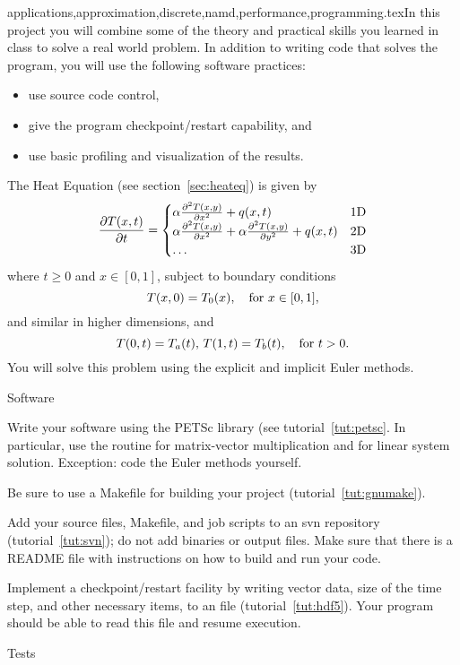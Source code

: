 {applications,approximation,discrete,namd,performance,programming}.texIn this project you will combine some of the theory and practical
skills you learned in class to solve a real world problem. In addition
to writing code that solves the program, you will use the following
software practices:
\begin{itemize}
  \item use source code control,
  \item give the program checkpoint/restart capability, and
  \item use basic profiling and visualization of the results.
\end{itemize}

The Heat Equation (see section~\ref{sec:heateq}) is given by
\[ \frac{\partial T(x,t)}{\partial t}=
\begin{cases}
  \alpha \frac{\partial^2 T(x,y)}{\partial x^2}+q(x,t)&\hbox{1D}\\
  \alpha \frac{\partial^2 T(x,y)}{\partial x^2}+
    \alpha \frac{\partial^2 T(x,y)}{\partial y^2}+q(x,t)&\hbox{2D}\\
    \ldots&\hbox{3D}
\end{cases}
\]
where $t\geq 0$ and $x\in[0,1]$, subject to boundary conditions
\[ T(x,0)=T_0(x),\quad\hbox{for $x\in[0,1]$}, \]
and similar in higher dimensions, and
\[ T(0,t)=T_a(t),\, T(1,t)=T_b(t),\quad\hbox{for $t>0$}. \]
You will solve this problem using the explicit and implicit Euler
methods.

 {Software}

Write your software using the PETSc library (see
tutorial~\ref{tut:petsc}. In particular, use the  routine
for matrix-vector multiplication and  for linear system
solution. Exception: code the Euler methods yourself.

Be sure to use a Makefile for building your project (tutorial~\ref{tut:gnumake}).

Add your source files, Makefile, and job scripts to an svn repository
(tutorial~\ref{tut:svn}); do not add binaries or output files. Make
sure that there is a README
file with instructions on how to build and run your code.

Implement a checkpoint/restart facility by writing vector data, size
of the time step, and other necessary items, to an  file
(tutorial~\ref{tut:hdf5}). Your program should be able to read this
file and resume execution.

 {Tests}

